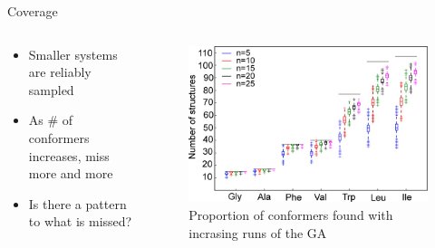 \documentclass[10pt]{beamer}
\begin{document}
{%
\begin{frame}{Coverage}
	\begin{columns}[c] %
		\begin{column}{.4\textwidth}
			\begin{itemize}
				\item {Smaller systems are reliably sampled}
				\item {As \# of conformers increases, miss more and more}
				\item {Is there a pattern to what is missed?}
			\end{itemize}
		\end{column}
		\hfill
		\begin{column}{0.6\textwidth}
			\begin{figure}
				\includegraphics[width=\linewidth]{images/Supady4.jpeg}
				\caption*{Proportion of conformers found with incrasing runs of the GA}
			\end{figure}
		\end{column}
	\end{columns}
\end{frame}
}
\end{document}
